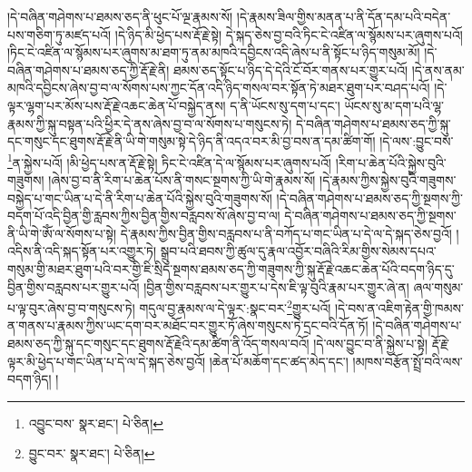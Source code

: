 །དེ་བཞིན་གཤེགས་པ་ཐམས་ཅད་ནི་ཕུང་པོ་ལྔ་རྣམས་སོ། །དེ་རྣམས་ཟིལ་གྱིས་མནན་པ་ནི་དོན་དམ་པའི་བདེན་པས་གཅིག་ཏུ་མཛད་པའོ། །དེ་ཉིད་མི་ཕྱེད་པས་རྡོ་རྗེ་སྟེ། དེ་སྐད་ཅེས་བྱ་བའི་ཏིང་ངེ་འཛིན་ལ་སྙོམས་པར་ཞུགས་པའོ། །ཏིང་ངེ་འཛིན་ལ་སྙོམས་པར་ཞུགས་མ་ཐག་ཏུ་ནམ་མཁའི་དབྱིངས་འདི་ཞེས་པ་ནི་སྟོང་པ་ཉིད་གསུམ་མོ། །དེ་བཞིན་གཤེགས་པ་ཐམས་ཅད་ཀྱི་རྡོ་རྗེ་ནི། ཐམས་ཅད་སྟོང་པ་ཉིད་དེ་དེའི་ངོ་བོར་གནས་པར་གྱུར་པའོ། །དེ་ནས་ནམ་མཁའི་དབྱིངས་ཞེས་བྱ་བ་ལ་སོགས་པས་ཀྱང་དོན་འདི་ཉིད་གསལ་བར་སྟོན་ཏེ་མཐར་ཐུག་པར་བཤད་པའོ། །དེ་ལྟར་ལྷག་པར་མོས་པས་རྡོ་རྗེ་འཆང་ཆེན་པོ་བསྐྱེད་ནས། ད་ནི་ཡོངས་སུ་དག་པ་དང་། ཡོངས་སུ་མ་དག་པའི་ལྷ་རྣམས་ཀྱི་སྐུ་བསྟན་པའི་ཕྱིར་དེ་ནས་ཞེས་བྱ་བ་ལ་སོགས་པ་གསུངས་ཏེ། དེ་བཞིན་གཤེགས་པ་ཐམས་ཅད་ཀྱི་སྐུ་དང་གསུང་དང་ཐུགས་རྡོ་རྗེ་ནི་ཡི་གེ་གསུམ་སྟེ་དེ་ཉིད་ནི་འདའ་བར་མི་བྱ་བས་ན་དམ་ཚིག་གོ། །དེ་ལས་:བྱུང་བས་\footnote{འབྱུང་བས་  སྣར་ཐང་།  པེ་ཅིན། }ན་སྐྱེས་པའོ། །མི་ཕྱེད་པས་ན་རྡོ་རྗེ་སྟེ། ཏིང་ངེ་འཛིན་དེ་ལ་སྙོམས་པར་ཞུགས་པའོ། །རིག་པ་ཆེན་པོའི་སྐྱེས་བུའི་གཟུགས། །ཞེས་བྱ་བ་ནི་རིག་པ་ཆེན་པོས་ནི་གསང་སྔགས་ཀྱི་ཡི་གེ་རྣམས་སོ། །དེ་རྣམས་ཀྱིས་སྐྱེས་བུའི་གཟུགས་བསྐྱེད་པ་གང་ཡིན་པ་དེ་ནི་རིག་པ་ཆེན་པོའི་སྐྱེས་བུའི་གཟུགས་སོ། །དེ་བཞིན་གཤེགས་པ་ཐམས་ཅད་ཀྱི་སྔགས་ཀྱི་བདག་པོ་འདི་བྱིན་གྱི་རླབས་ཀྱིས་བྱིན་གྱིས་བརླབས་སོ་ཞེས་བྱ་བ་ལ། དེ་བཞིན་གཤེགས་པ་ཐམས་ཅད་ཀྱི་སྔགས་ནི་ཡི་གེ་ཨོཾ་ལ་སོགས་པ་སྟེ། དེ་རྣམས་ཀྱིས་བྱིན་གྱིས་བརླབས་པ་ནི་བཀོད་པ་གང་ཡིན་པ་དེ་ལ་དེ་སྐད་ཅེས་བྱའོ། །འདིས་ནི་འདི་སྐད་སྟོན་པར་འགྱུར་ཏེ། སྒྲུབ་པའི་ཐབས་ཀྱི་ཚུལ་དུ་རྣལ་འབྱོར་བཞིའི་རིམ་གྱིས་སེམས་དཔའ་གསུམ་གྱི་མཐར་ཐུག་པའི་བར་གྱི་ཇི་སྲིད་སྔགས་ཐམས་ཅད་ཀྱི་གཟུགས་ཀྱི་སྐུ་རྡོ་རྗེ་འཆང་ཆེན་པོའི་བདག་ཉིད་དུ་བྱིན་གྱིས་བརླབས་པར་གྱུར་པའོ། །བྱིན་གྱིས་བརླབས་པར་གྱུར་པ་དེས་ཇི་ལྟ་བུའི་རྣམ་པར་གྱུར་ཞེ་ན། ཞལ་གསུམ་པ་ལྟ་བུར་ཞེས་བྱ་བ་གསུངས་ཏེ། གདུལ་བྱ་རྣམས་ལ་དེ་ལྟར་:སྣང་བར་\footnote{བྱུང་བར་  སྣར་ཐང་།  པེ་ཅིན། }གྱུར་པའོ། །དེ་བས་ན་འཇིག་རྟེན་གྱི་ཁམས་ན་གནས་པ་རྣམས་ཀྱིས་ཡང་དག་བར་མཐོང་བར་གྱུར་ཏོ་ཞེས་གསུངས་ཏེ་དྲང་བའི་དོན་ཏོ། །དེ་བཞིན་གཤེགས་པ་ཐམས་ཅད་ཀྱི་སྐུ་དང་གསུང་དང་ཐུགས་རྡོ་རྗེའི་དམ་ཚིག་ནི་འོད་གསལ་བའོ། །དེ་ལས་བྱུང་བ་ནི་སྐྱེས་པ་སྟེ། རྡོ་རྗེ་ལྟར་མི་ཕྱེད་པ་གང་ཡིན་པ་དེ་ལ་དེ་སྐད་ཅེས་བྱའོ། །ཆེན་པོ་མཆོག་དང་ཚད་མེད་དང་། །མཁས་བརྩོན་སྤྲོ་བའི་ལས་བདག་ཉིད། །
